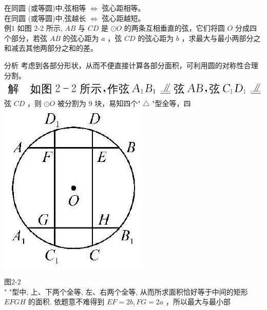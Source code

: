 \documentclass[10pt]{article}
\begin{document}
在同圆 (或等圆)中,弦相等 $\Leftrightarrow$ 弦心距相等。\\
在同圆 (或等圆)中,弦越长 $\Leftrightarrow$ 弦心距越短。\\
例1 如图 2-2 所示, $A B$ 与 $C D$ 是 $\odot O$ 的两条互相垂直的弦，它们将圆 $O$ 分成四个部分，若弦 $A B$ 的弦心距为 $a$ ，弦 $C D$ 的弦心距为 $b$ ，求最大与最小两部分之和减去其他两部分之和的差。

分析 考虑到各部分形状，从而不便直接计算各部分面积，可利用圆的对称性合理分割。\\
\includegraphics[max width=\textwidth]{2024_10_30_66b8e5e701da2093c133g-017}弦 $C D$ ，则 $\odot O$ 被分割为 9 块，易知四个" $\triangle$ "型全等，四\\
\includegraphics[max width=\textwidth, center]{2024_10_30_66b8e5e701da2093c133g-017(1)}

图2-2\\
" "型中, 上、下两个全等, 左、右两个全等, 从而所求面积恰好等于中间的矩形 $E F G H$ 的面积. 依题意不难得到 $E F=2 b, F G=2 a$ ，所以最大与最小部
\end{document}
